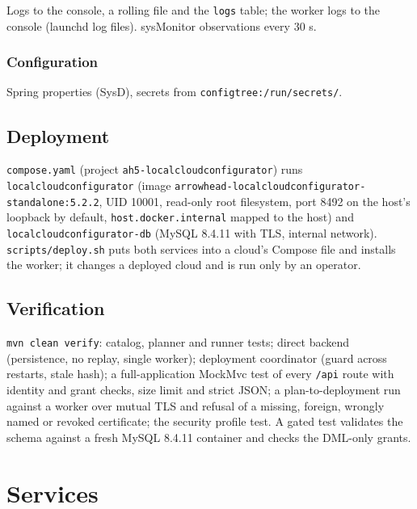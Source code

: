 \documentclass[a4paper]{arrowhead}
\begin{document}
Logs to the console, a rolling file and the \texttt{logs} table; the worker logs to the console (launchd log files). sysMonitor observations every 30 s.

\subsubsection{Configuration}

Spring properties (SysD), secrets from \texttt{configtree:\allowbreak{}/\allowbreak{}run/\allowbreak{}secrets/}.

\subsection{Deployment}

\texttt{compose.yaml} (project \texttt{ah5-\allowbreak{}localcloudconfigurator}) runs \texttt{localcloudconfigurator} (image \texttt{arrowhead-\allowbreak{}localcloudconfigurator-\allowbreak{}standalone:\allowbreak{}5.2.2}, UID 10001, read-only root filesystem, port 8492 on the host's loopback by default, \texttt{host.\allowbreak{}docker.\allowbreak{}internal} mapped to the host) and \texttt{localcloudconfigurator-\allowbreak{}db} (MySQL 8.4.11 with TLS, internal network). \texttt{scripts/\allowbreak{}deploy.\allowbreak{}sh} puts both services into a cloud's Compose file and installs the worker; it changes a deployed cloud and is run only by an operator.

\subsection{Verification}

\texttt{mvn clean verify}: catalog, planner and runner tests; direct backend (persistence, no replay, single worker); deployment coordinator (guard across restarts, stale hash); a full-application MockMvc test of every \texttt{/api} route with identity and grant checks, size limit and strict JSON; a plan-to-deployment run against a worker over mutual TLS and refusal of a missing, foreign, wrongly named or revoked certificate; the security profile test. A gated test validates the schema against a fresh MySQL 8.4.11 container and checks the DML-only grants.

\newpage

\section{Services}
\label{sec:services}
\end{document}
